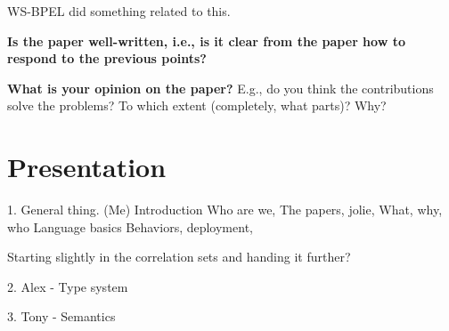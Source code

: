 \documentclass[a4paper,10pt,titlepage]{report}
\begin{document}
WS-BPEL did something related to this.

\textbf{\itemTitle Is the paper well-written, i.e., is it clear from the paper how
to respond to the previous points?}

\stdLines

\textbf{\itemTitle What is your opinion on the paper?} E.g., do you think the
contributions solve the problems? To which extent (completely, what parts)?
Why?




\section{Presentation}

1. General thing. (Me)
Introduction
	Who are we, 
	The papers,
	jolie,
		What, why, who	
		Language basics
			Behaviors, deployment,
				
			
		Starting slightly in the correlation sets and handing it further?

2. Alex - Type system

3. Tony - Semantics
\end{document}
